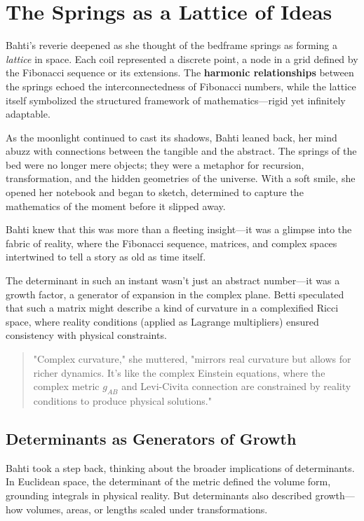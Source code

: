 \section*{The Springs as a Lattice of Ideas}

Bahti’s reverie deepened as she thought of the bedframe springs as forming a \textit{lattice} in space. Each coil represented a discrete point, a node in a grid defined by the Fibonacci sequence or its extensions. The \textbf{harmonic relationships} between the springs echoed the interconnectedness of Fibonacci numbers, while the lattice itself symbolized the structured framework of mathematics—rigid yet infinitely adaptable.

As the moonlight continued to cast its shadows, Bahti leaned back, her mind abuzz with connections between the tangible and the abstract. The springs of the bed were no longer mere objects; they were a metaphor for recursion, transformation, and the hidden geometries of the universe. With a soft smile, she opened her notebook and began to sketch, determined to capture the mathematics of the moment before it slipped away.

Bahti knew that this was more than a fleeting insight—it was a glimpse into the fabric of reality, where the Fibonacci sequence, matrices, and complex spaces intertwined to tell a story as old as time itself.





The determinant in such an instant wasn’t just an abstract number—it was a growth factor, a generator of expansion in the complex plane. Betti speculated that such a matrix might describe a kind of curvature in a complexified Ricci space, where reality conditions (applied as Lagrange multipliers) ensured consistency with physical constraints.

\begin{quote}
"Complex curvature," she muttered, "mirrors real curvature but allows for richer dynamics. It’s like the complex Einstein equations, where the complex metric \(g_{AB}\) and Levi-Civita connection are constrained by reality conditions to produce physical solutions."
\end{quote}

\subsection*{Determinants as Generators of Growth}

Bahti took a step back, thinking about the broader implications of determinants. In Euclidean space, the determinant of the metric defined the volume form, grounding integrals in physical reality. But determinants also described growth—how volumes, areas, or lengths scaled under transformations.

